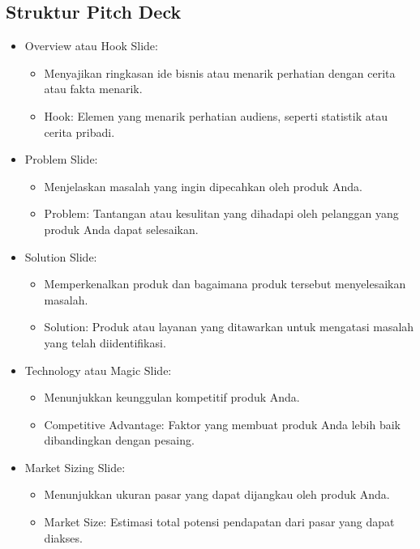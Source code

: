 \documentclass{article}
\begin{document}
\subsection{Struktur Pitch Deck}
\begin{itemize}
    \item Overview atau Hook Slide:
          \begin{itemize}
              \item Menyajikan ringkasan ide bisnis atau menarik perhatian dengan cerita atau fakta menarik.
              \item Hook: Elemen yang menarik perhatian audiens, seperti statistik atau cerita pribadi.
          \end{itemize}
    \item Problem Slide:
          \begin{itemize}
              \item Menjelaskan masalah yang ingin dipecahkan oleh produk Anda.
              \item Problem: Tantangan atau kesulitan yang dihadapi oleh pelanggan yang produk Anda dapat selesaikan.
          \end{itemize}
    \item Solution Slide:
          \begin{itemize}
              \item Memperkenalkan produk dan bagaimana produk tersebut menyelesaikan masalah.
              \item Solution: Produk atau layanan yang ditawarkan untuk mengatasi masalah yang telah diidentifikasi.
          \end{itemize}
    \item Technology atau Magic Slide:
          \begin{itemize}
              \item Menunjukkan keunggulan kompetitif produk Anda.
              \item Competitive Advantage: Faktor yang membuat produk Anda lebih baik dibandingkan dengan pesaing.
          \end{itemize}
    \item Market Sizing Slide:
          \begin{itemize}
              \item Menunjukkan ukuran pasar yang dapat dijangkau oleh produk Anda.
              \item Market Size: Estimasi total potensi pendapatan dari pasar yang dapat diakses.
          \end{itemize}

\end{itemize}
\end{document}
